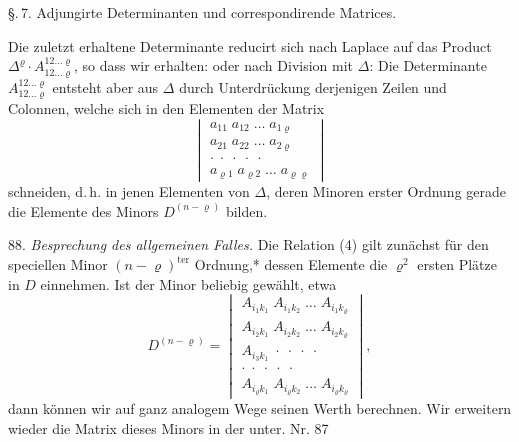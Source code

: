 \S.\,7. Adjungirte Determinanten und correspondirende Matrices.

Die zuletzt erhaltene Determinante reducirt sich nach Laplace auf das Product $\Delta^\varrho\cdot A^{12\ldots\varrho}_{12\ldots\varrho}$, so dass wir erhalten:
oder nach Division mit $\Delta$:
Die Determinante $A^{12\ldots\varrho}_{12\ldots\varrho}$ entsteht aber aus $\Delta$ durch Unterdrückung derjenigen Zeilen und Colonnen, welche sich in den Elementen der Matrix
\[
\begin{vmatrix}
a_{11}\;a_{12}\;\ldots\;a_{1\varrho} \\
a_{21}\;a_{22}\;\ldots\;a_{2\varrho} \\
\cdot\;\cdot\;\cdot\;\cdot\;\cdot \\
a_{\varrho 1}\;a_{\varrho 2}\;\ldots\;a_{\varrho\varrho}
\end{vmatrix}
\]
schneiden, d.\,h. in jenen Elementen von $\Delta$, deren Minoren erster Ordnung gerade die Elemente des Minors $D^{(n-\varrho)}$ bilden.

88. \textit{Besprechung des allgemeinen Falles.} Die Relation (4) gilt zunächst für den speciellen Minor $(n-\varrho)^{\text{ter}}$ Ordnung,* dessen Elemente die $\varrho^2$ ersten Plätze in $D$ einnehmen.
Ist der Minor beliebig gewählt, etwa
\[
D^{(n-\varrho)}=
\begin{vmatrix}
A_{i_1k_1}\;A_{i_1k_2}\;\ldots\;A_{i_1k_\varrho} \\
A_{i_2k_1}\;A_{i_2k_2}\;\ldots\;A_{i_2k_\varrho} \\
A_{i_3k_1}\;\cdot\;\cdot\;\cdot\;\cdot \\
\cdot\;\cdot\;\cdot\;\cdot\;\cdot \\
A_{i_\varrho k_1}\;A_{i_\varrho k_2}\;\ldots\;A_{i_\varrho k_\varrho}
\end{vmatrix},
\]
dann können wir auf ganz analogem Wege seinen Werth berechnen. Wir erweitern wieder die Matrix dieses Minors in der unter. Nr. 87 %


